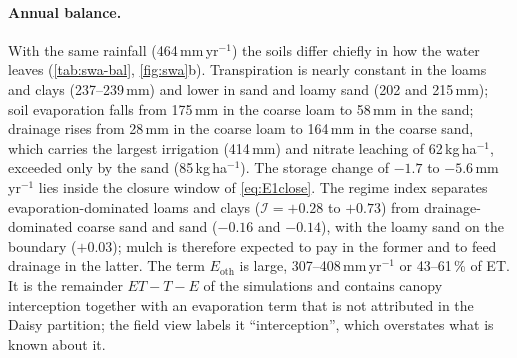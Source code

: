 \paragraph{Annual balance.} With the same rainfall (464\,mm\,yr$^{-1}$) the soils differ chiefly in how the water leaves (\cref{tab:swa-bal}, \cref{fig:swa}b). Transpiration is nearly constant in the loams and clays (237--239\,mm) and lower in sand and loamy sand (202 and 215\,mm); soil evaporation falls from 175\,mm in the coarse loam to 58\,mm in the sand; drainage rises from 28\,mm in the coarse loam to 164\,mm in the coarse sand, which carries the largest irrigation (414\,mm) and nitrate leaching of 62\,kg\,ha$^{-1}$, exceeded only by the sand (85\,kg\,ha$^{-1}$). The storage change of $-1.7$ to $-5.6$\,mm\,yr$^{-1}$ lies inside the closure window of \cref{eq:E1close}. The regime index separates evaporation-dominated loams and clays ($\mathcal I=+0.28$ to $+0.73$) from drainage-dominated coarse sand and sand ($-0.16$ and $-0.14$), with the loamy sand on the boundary ($+0.03$); mulch is therefore expected to pay in the former and to feed drainage in the latter. The term $E_{\mathrm{oth}}$ is large, 307--408\,mm\,yr$^{-1}$ or 43--61\,\% of ET. It is the remainder $\mathit{ET}-T-E$ of the simulations and contains canopy interception together with an evaporation term that is not attributed in the Daisy partition; the field view labels it ``interception'', which overstates what is known about it.

